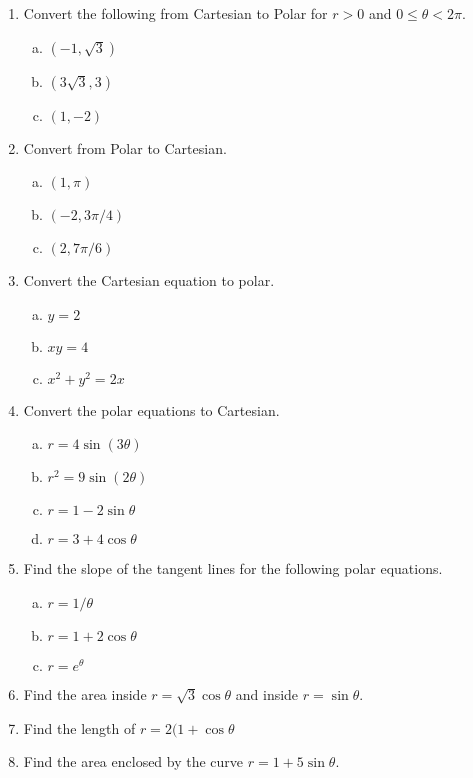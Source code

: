 \documentclass[10pt]{article}
\theoremstyle{Theorem}
\theoremstyle{definition}
\theoremstyle{remark}
\theoremstyle{custom}
\begin{document}
\begin{enumerate}[1.]
\item Convert the following from Cartesian to Polar for $r>0$ and $0\leq \theta <2\pi$.
\begin{enumerate}[a.]
\item $(-1,\sqrt{3})$
\item $(3\sqrt{3}, 3)$
\item $(1,-2)$
\end{enumerate}
\item Convert from Polar to Cartesian.
\begin{enumerate}[a.]
\item $(1,\pi)$
\item $(-2, 3\pi/4)$
\item $(2, 7\pi/6)$
\end{enumerate}
\item Convert the Cartesian equation to polar.
\begin{enumerate}[a.]
\item $y=2$
\item $xy=4$
\item $x^2+y^2=2x$
\end{enumerate}
\item Convert the polar equations to Cartesian.
\begin{enumerate}[a.]
\item $r=4\sin(3\theta)$
\item $r^2=9\sin(2\theta)$
\item $r=1-2\sin\theta$
\item $r=3+4\cos\theta$
\end{enumerate}
\item Find the slope of the tangent lines for the following polar equations.
\begin{enumerate}[a.]
\item $r=1/\theta$
\item $r=1+2\cos\theta$
\item $r=e^{\theta}$
\end{enumerate}
\item Find the area inside $r=\sqrt{3}\cos\theta$ and inside $r=\sin\theta$.
\item Find the length of $r=2(1+\cos\theta$
\item Find the area enclosed by the curve $r=1+5\sin\theta$.
\end{enumerate}
\end{document}
